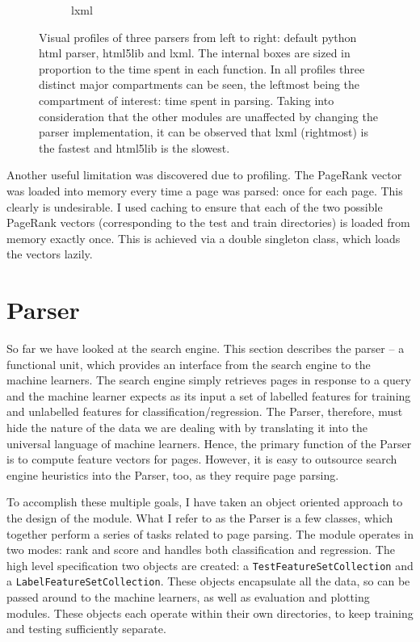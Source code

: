 \documentclass[12pt,notitlepage,twoside]{scrreprt}
\begin{document}
\begin{figure}[h!]
\begin{subfigure}[b]{.3\textwidth}
  \caption{lxml}
  \label{lxml}
\end{subfigure}
\caption{Visual profiles of three parsers from left to right: default python
html parser, html5lib and lxml. The internal boxes are sized in proportion to
the time spent in each function. In all profiles three distinct major
compartments can be seen, the leftmost being the compartment of interest: 
time spent in parsing. Taking into consideration that the other modules are unaffected by changing the parser
implementation, it can be observed that lxml (rightmost) is the fastest and
html5lib is the slowest.\label{parsers}}
\end{figure}

Another useful limitation was discovered due to profiling. The PageRank vector
was loaded into memory every time a page was parsed: once for each page. This
clearly is undesirable. I used caching to ensure that each of the two possible
PageRank vectors (corresponding to the test and train directories) is loaded
from memory exactly once. This is achieved via a double singleton class, which
loads the vectors lazily.

\cleardoublepage

\section{Parser}
\label{sec:parser}
So far we have looked at the search engine. This section describes the parser -- a
functional unit, which provides an interface from the search engine to the machine
learners.  The search engine simply retrieves pages in response to a query and the machine
learner expects as its input a set of labelled features for training and unlabelled
features for classification/regression.  The Parser, therefore, must hide the nature of
the data we are dealing with by translating it into the universal language of machine
learners. Hence, the primary function of the Parser is to compute feature vectors for
pages.  However, it is easy to outsource search engine heuristics into the Parser, too, as
they require page parsing. 

To accomplish these multiple goals, I have
taken an object oriented approach to the design of the module. What I refer to
as the Parser is a few classes, which together perform a series of tasks
related to page parsing.  The module operates in two modes: rank and score and
handles both classification and regression. The high level specification two objects are
created: a \texttt{TestFeatureSetCollection} and a
\texttt{LabelFeatureSetCollection}. These objects encapsulate all the data,
so can be passed around to the machine learners, as well as evaluation and
plotting modules. These objects each operate within their own directories, to
keep training and testing sufficiently separate.
\end{document}
